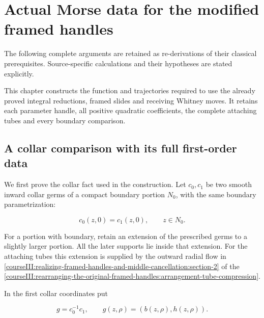 \section{Actual Morse data for the modified framed handles}\label{courseIII:realizing-framed-handles-and-middle-cancellation:section}

The following complete arguments are retained as re-derivations of their classical prerequisites. Source-specific calculations and their hypotheses are stated explicitly.

This chapter constructs the function and trajectories required to use the already proved integral reductions, framed slides and receiving Whitney moves. It retains each parameter handle, all positive quadratic coefficients, the complete attaching tubes and every boundary comparison.

\subsection{A collar comparison with its full first-order data}
\label{courseIII:realizing-framed-handles-and-middle-cancellation:middle-collar-comparison}

\label{courseIII:realizing-framed-handles-and-middle-cancellation:section-1}\label{courseIII:middle-cancel:1}

We first prove the collar fact used in the construction. Let \(c_0,c_1\) be two smooth inward collar germs of a compact boundary portion \(N_0\), with the same boundary parametrization:

\begin{equation}
c_0(z,0)=c_1(z,0),\qquad z\in N_0.
 \label{courseIII:realizing-framed-handles-and-middle-cancellation:eq:1.1}
\end{equation}

For a portion with boundary, retain an extension of the prescribed germs to a slightly larger portion. All the later supports lie inside that extension. For the attaching tubes this extension is supplied by the outward radial flow in \cref{courseIII:realizing-framed-handles-and-middle-cancellation:section-2} of the \cref{courseIII:rearranging-the-original-framed-handles:arrangement-tube-compression}.

In the first collar coordinates put

\begin{equation}
g=c_0^{-1}c_1,\qquad
 g(z,\rho)=(b(z,\rho),h(z,\rho)).
 \label{courseIII:realizing-framed-handles-and-middle-cancellation:eq:1.2}
\end{equation}

